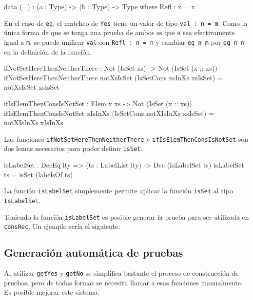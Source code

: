 \begin{code}
data (=) : (a : Type) -> (b : Type) -> Type where
  Refl : x = x
\end{code}

En el caso de \texttt{eq}, el matcheo de \texttt{Yes} tiene un valor de tipo \texttt{val : n = m}. Como la única forma de que se tenga una prueba de ambos es que \texttt{n} sea efectivamente igual a \texttt{m}, se puede unificar \texttt{val} con \texttt{Refl : n = n} y cambiar \texttt{eq n m} por \texttt{eq n n} en la definición de la función.

\begin{code}
ifNotSetHereThenNeitherThere : Not (IsSet xs) ->
  Not (IsSet (x :: xs))
ifNotSetHereThenNeitherThere notXsIsSet
  (IsSetCons xsInXs xsIsSet) = notXsIsSet xsIsSet

ifIsElemThenConsIsNotSet : Elem x xs ->
  Not (IsSet (x :: xs))
ifIsElemThenConsIsNotSet xIsInXs
  (IsSetCons notXIsInXs xsIsSet) = notXIsInXs xIsInXs
\end{code}

Las funciones \texttt{ifNotSetHereThenNeitherThere} y \texttt{ifIsElemThenConsIsNotSet} son dos lemas necesarios para poder definir \texttt{isSet}.

\begin{code}
isLabelSet : DecEq lty => (ts : LabelList lty) ->
  Dec (IsLabelSet ts)
isLabelSet ts = isSet (labelsOf ts)
\end{code}

La función \texttt{isLabelSet} simplemente permite aplicar la función \texttt{isSet} al tipo \texttt{IsLabelSet}.

Teniendo la función \texttt{isLabelSet} es posible generar la prueba para ser utilizada en \texttt{consRec}. Un ejemplo sería el siguiente:


\subsection{Generación automática de pruebas}

Al utilizar \texttt{getYes} y \texttt{getNo} se simplifica bastante el proceso de construcción de pruebas, pero de todas formas se necesita llamar a esas funciones manualmente. Es posible mejorar este sistema.

